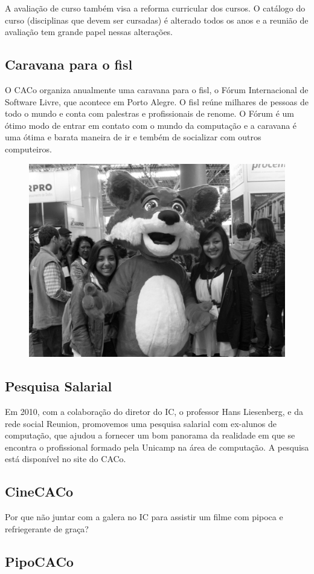 A avaliação de curso também visa a reforma curricular dos cursos. O catálogo do
curso (disciplinas que devem ser cursadas) é alterado todos os anos e a reunião
de avaliação tem grande papel nessas alterações.

\subsection{Caravana para o fisl}

O CACo organiza anualmente uma caravana para o fisl, o Fórum Internacional de
Software Livre, que acontece em Porto Alegre. O fisl reúne milhares de pessoas
de todo o mundo e conta com palestras e profissionais de renome. O Fórum é um
ótimo modo de entrar em contato com o mundo da computação e a caravana é uma
ótima e barata maneira de ir e tembém de socializar com outros computeiros.

\begin{figure}[H]
    \centering
    \includegraphics[width=.45\textwidth]{img/alem_da_graduacao/caco_fisl1.jpg}
\end{figure}

\subsection{Pesquisa Salarial}

Em 2010, com a colaboração do diretor do IC, o professor Hans Liesenberg, e da
rede social Reunion, promovemos uma pesquisa salarial com ex-alunos de
computação, que ajudou a fornecer um bom panorama da realidade em que se
encontra o profissional formado pela Unicamp na área de computação. A pesquisa
está disponível no site do CACo.

\subsection{CineCACo}

Por que não juntar com a galera no IC para assistir um filme com pipoca e
refriegerante de graça?

\subsection{PipoCACo}

